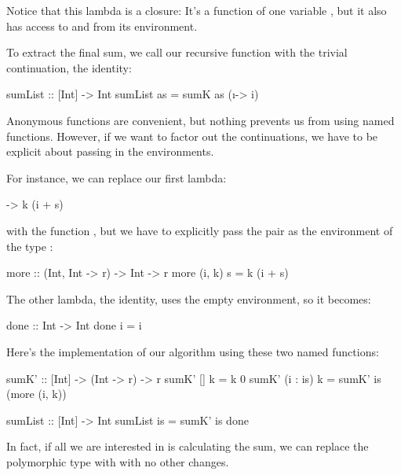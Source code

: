 \documentclass[DaoFP]{subfiles}
\begin{document}
Notice that this lambda is a closure: It's a function of one variable , but it also has access to  and  from its environment.

To extract the final sum, we call our recursive function with the trivial continuation, the identity:
\begin{haskell}
sumList :: [Int] -> Int
sumList as = sumK as (\i -> i)
\end{haskell}

Anonymous functions are convenient, but nothing prevents us from using named functions. However, if we want to factor out the continuations, we have to be explicit about passing in the environments. 

For instance, we can replace our first lambda:
\begin{haskell}
\s -> k (i + s)
\end{haskell}
with the function , but we have to explicitly pass the pair  as the environment of the type :
\begin{haskell}
more :: (Int, Int -> r) -> Int -> r
more (i, k) s = k (i + s)
\end{haskell}
The other lambda, the identity, uses the empty environment, so it becomes:
\begin{haskell}
done :: Int -> Int
done i = i
\end{haskell}
Here's the implementation of our algorithm using these two named functions:
\begin{haskell}
sumK' :: [Int] -> (Int -> r) -> r
sumK' [] k = k 0
sumK' (i : is) k =
  sumK' is (more (i, k))
\end{haskell}

\begin{haskell}
sumList :: [Int] -> Int
sumList is = sumK' is done
\end{haskell}

In fact, if all we are interested in is calculating the sum, we can replace the polymorphic type  with  with no other changes.
\end{document}
